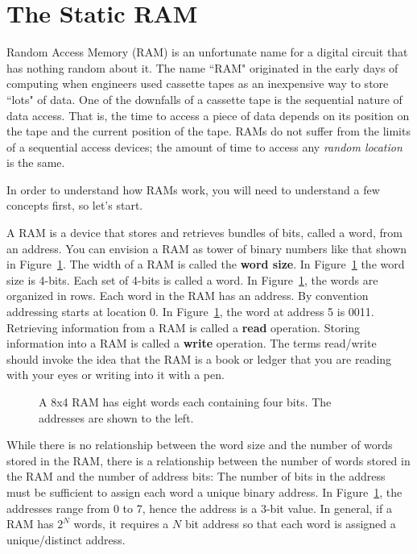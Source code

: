 
\section{The Static RAM}
Random Access Memory (RAM) is an unfortunate name for a digital circuit 
that has nothing random about it.  The name ``RAM" originated in the early 
days of computing when engineers used cassette tapes as an inexpensive way 
to store ``lots" of data.  One of the downfalls of a cassette tape is the
sequential nature of data access.  That is, the time to access a piece of 
data depends on its position on the tape and the current position of the
tape.  RAMs do not suffer from the limits of a sequential access devices; the 
amount of time to access any \textit{ random location} is the same.  

In order to understand how RAMs work, you will need to understand a few
concepts first, so let's start.

A RAM is a device that stores and retrieves bundles of bits, called 
a word, from an address.  You can envision a RAM as tower 
of binary numbers like that shown in Figure~\ref{fig:sequentialBBram}.
The width of a RAM is called the \textbf{word size}.  In Figure~\ref{fig:sequentialBBram}
the word size is 4-bits.  Each set of 4-bits is called a word.  In 
Figure~\ref{fig:sequentialBBram}, the words are organized in rows.
Each word in the RAM has an address. By convention addressing
starts at location 0.  In Figure~\ref{fig:sequentialBBram}, the word at
address 5 is 0011.  Retrieving information from a RAM is called a
\textbf{read} operation.  Storing information into a RAM is called a \textbf{write}
operation.  The terms read/write should invoke the idea that the RAM is a
book or ledger that you are reading with your eyes or writing into it with a pen.

\begin{figure}[ht]
\caption{A 8x4 RAM has eight words each containing four bits.  The addresses
are shown to the left.}
\label{fig:sequentialBBram}
\end{figure}



While there is no relationship between the word size and the number of 
words stored in the RAM, there is a relationship between the number
of words stored in the RAM and the number of address bits:
The number of bits in the address must be sufficient to assign 
each word a unique binary address.  In Figure~\ref{fig:sequentialBBram}, the 
addresses range from 0 to 7, hence the address is a 3-bit value.   In general, 
if a RAM has $2^N$ words, it requires a  $N$ bit address so that each word 
is assigned a unique/distinct address.  

